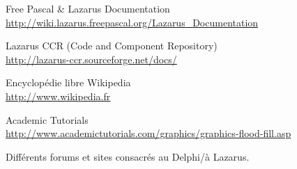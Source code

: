 \begin{thebibliography}{}
	\newblock Free Pascal \& Lazarus Documentation\\
	\newblock \url{http://wiki.lazarus.freepascal.org/Lazarus_Documentation} \newline
	
	\newblock Lazarus CCR (Code and Component Repository)\\
	\newblock \url{http://lazarus-ccr.sourceforge.net/docs/} \newline
	
	\newblock Encyclopédie libre Wikipedia\\
	\newblock \url{http://www.wikipedia.fr} \newline
	

	\newblock Academic Tutorials\\
	\newblock \url{http://www.academictutorials.com/graphics/graphics-flood-fill.asp} \newline
	
	\newblock Différents forums et sites consacrés au Delphi/à Lazarus.\\

	
\end{thebibliography}
